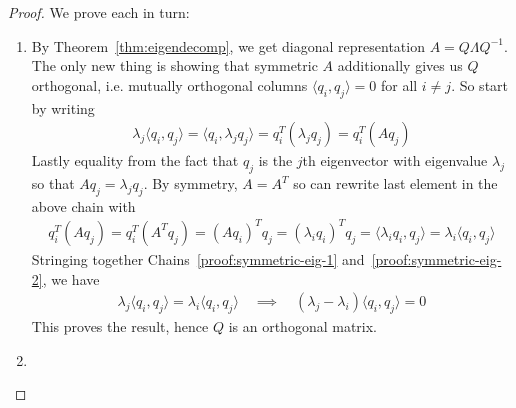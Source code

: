 \documentclass[12pt]{book}
\numberwithin{equation}{section} %
\theoremstyle{plain}
\theoremstyle{definition}
\theoremstyle{remark}
\begin{document}
\clearpage
\begin{proof}
We prove each in turn:
\begin{enumerate}[label=(\roman*)]
  \item
    By Theorem~\ref{thm:eigendecomp}, we get diagonal representation
    $A=Q\Lambda Q^{-1}$. The only new thing is showing that symmetric
    $A$ additionally gives us $Q$ orthogonal, i.e.  mutually orthogonal
    columns $\langle q_i,q_j\rangle=0$ for all $i\neq j$.
    So start by writing
    \begin{align}
      \lambda_j \langle q_i, q_j \rangle
      =
      \langle q_i, \lambda_j q_j \rangle
      = q_i^T (\lambda_j q_j)
      = q_i^T (A q_j)
      \label{proof:symmetric-eig-1}
    \end{align}
    Lastly equality from the fact that $q_j$ is the $j$th eigenvector
    with eigenvalue $\lambda_j$ so that $Aq_j=\lambda_j q_j$. By
    symmetry, $A=A^T$ so can rewrite last element in the above chain
    with
    \begin{align}
      q_i^T (A q_j)
      = q_i^T (A^T q_j)
      = (Aq_i)^T q_j
      = (\lambda_i q_i)^T q_j
      = \langle \lambda_i q_i, q_j \rangle
      = \lambda_i \langle q_i, q_j \rangle
      \label{proof:symmetric-eig-2}
    \end{align}
    Stringing together Chains~\ref{proof:symmetric-eig-1}
    and~\ref{proof:symmetric-eig-2}, we have
    \begin{align*}
      \lambda_j \langle q_i, q_j \rangle
      = \lambda_i \langle q_i, q_j \rangle
      \quad\implies\quad
      (\lambda_j-\lambda_i) \langle q_i, q_j \rangle
      = 0
    \end{align*}
    This proves the result, hence $Q$ is an orthogonal matrix.
  \item


\end{enumerate}
\end{proof}
\end{document}

